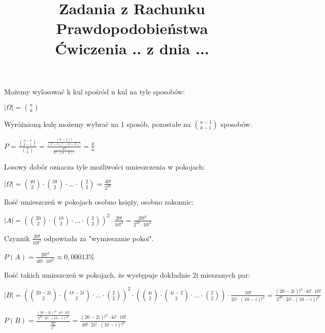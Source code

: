 \documentclass[fleqn]{article}
\begin{document}
\title{Zadania z Rachunku Prawdopodobieństwa \\ Ćwiczenia .. z dnia ...}
\date{}
\medskip
{}
\medskip

Możemy wylosować k kul spośród n kul na tyle sposobów:

$|\Omega|={n\choose k}$

Wyróżnioną kulę możemy wybrać na 1 sposób, pozostałe na ${n-1\choose k-1}$ sposobów.

$P=\frac{{n-1\choose k-1}}{{n\choose k}}=\frac{\frac{(n-1)!}{(k-1)!\cdot(n-k)!}}{\frac{n!}{k!\cdot(n-k)!}}=\frac{k}{n}$

\medskip
{}
\medskip

Losowy dobór oznacza tyle możliwości umieszczenia w pokojach:

$|\Omega|={40\choose 2}\cdot{38\choose 2}\cdot...\cdot{2\choose 2}=\frac{40!}{2^{20}}$

Ilość umieszczeń w pokojach osobno księży, osobno zakonnic:

$|A|=\left({20\choose 2}\cdot{18\choose 2}\cdot...\cdot{2\choose 2}\right)^{2}\cdot\frac{20!}{10!^2}=\frac{20!^3}{2^{20}\cdot10!^2}$

Czynnik $\frac{20!}{10!^2}$ odpowiada za "wymieszanie pokoi".

$P(A)=\frac{20!^3}{40!\cdot10!^2}\approx0,00013\%$

Ilość takich umieszczeń w pokojach, że występuje dokładnie 2i mieszanych par:

$|B|=\left({20-2i\choose 2}\cdot{18-2i\choose 2}\cdot...\cdot{2\choose 2}\right)^{2}\cdot\left({4i\choose 2}\cdot{4i-2\choose 2}\cdot...\cdot{2\choose 2}\right)\cdot\frac{10!}{2i!\cdot(10-i)!^2}=\frac{(20-2i)!^2\cdot4i!\cdot10!}{2^{20}\cdot2i!\cdot(10-i)!^2}$

$P(B)=\frac{\frac{(20-2i)!^2\cdot4i!\cdot10!}{2^{20}\cdot2i!\cdot(10-i)!^2}}{\frac{40!}{2^{20}}}=\frac{(20-2i)!^2\cdot4i!\cdot10!}{40!\cdot2i!\cdot(10-i)!^2}$

\medskip

\medskip
\end{document}

